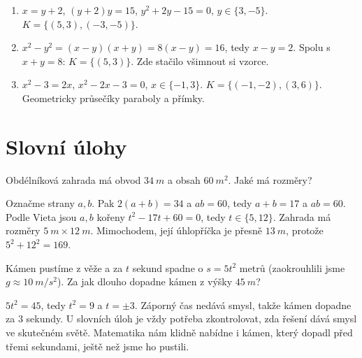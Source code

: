 \begin{solution}
  \begin{enumerate}[label=(\alph*)]
    \item $x = y + 2$, $(y + 2)y = 15$, $y^2 + 2y - 15 = 0$, $y\in\{3, -5\}$. $K = \{(5, 3), (-3, -5)\}$.
    \item $x^2 - y^2 = (x - y)(x + y) = 8(x - y) = 16$, tedy $x - y = 2$. Spolu s $x + y = 8$: $K = \{(5, 3)\}$. Zde stačilo všimnout si vzorce.
    \item $x^2 - 3 = 2x$, $x^2 - 2x - 3 = 0$, $x\in\{-1, 3\}$. $K = \{(-1, -2), (3, 6)\}$. Geometricky průsečíky paraboly a přímky.

    \begin{center}
    \end{center}
  \end{enumerate}
\end{solution}

\section{Slovní úlohy}

\begin{example}
  Obdélníková zahrada má obvod $34\ \si{m}$ a obsah $60\ \si{m^2}$. Jaké má rozměry?

  Označme strany $a, b$. Pak $2(a + b) = 34$ a $ab = 60$, tedy $a + b = 17$ a $ab = 60$. Podle Vieta jsou $a, b$ kořeny $t^2 - 17t + 60 = 0$, tedy $t\in\{5, 12\}$. Zahrada má rozměry $5\ \si{m}\times 12\ \si{m}$. Mimochodem, její úhlopříčka je přesně $13\ \si{m}$, protože $5^2 + 12^2 = 169$.
\end{example}

\begin{example}
  Kámen pustíme z věže a za $t$ sekund spadne o $s = 5t^2$ metrů (zaokrouhlili jsme $g\approx 10\ \si{m/s^2}$). Za jak dlouho dopadne kámen z výšky $45\ \si{m}$?

  $5t^2 = 45$, tedy $t^2 = 9$ a $t = \pm 3$. Záporný čas nedává smysl, takže kámen dopadne za $3$ sekundy. U slovních úloh je vždy potřeba zkontrolovat, zda řešení dává smysl ve skutečném světě. Matematika nám klidně nabídne i kámen, který dopadl před třemi sekundami, ještě než jsme ho pustili.
\end{example}

